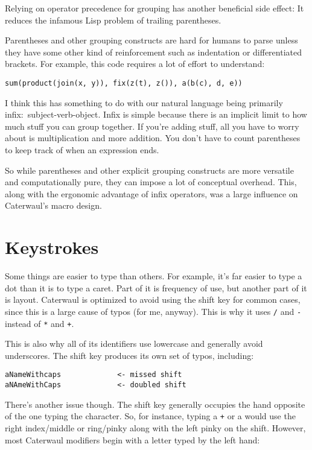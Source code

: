\documentclass{report}
\begin{document}
    Relying on operator precedence for grouping has another beneficial side effect: It reduces the infamous Lisp problem of trailing parentheses.

    Parentheses and other grouping constructs are hard for humans to parse unless they have some other kind of reinforcement such as indentation or differentiated brackets. For example, this
    code requires a lot of effort to understand:

\begin{verbatim}
sum(product(join(x, y)), fix(z(t), z()), a(b(c), d, e))
\end{verbatim}

    I think this has something to do with our natural language being primarily infix:~subject-verb-object. Infix is simple because there is an implicit limit to how much stuff you can group
    together. If you're adding stuff, all you have to worry about is multiplication and more addition. You don't have to count parentheses to keep track of when an expression ends.

    So while parentheses and other explicit grouping constructs are more versatile and computationally pure, they can impose a lot of conceptual overhead. This, along with the ergonomic
    advantage of infix operators, was a large influence on Caterwaul's macro design.

\section{Keystrokes}
    Some things are easier to type than others. For example, it's far easier to type a dot than it is to type a caret. Part of it is frequency of use, but another part of it is layout.
    Caterwaul is optimized to avoid using the shift key for common cases, since this is a large cause of typos (for me, anyway). This is why it uses \verb|/| and \verb|-| instead of \verb|*|
    and \verb|+|.

    This is also why all of its identifiers use lowercase and generally avoid underscores. The shift key produces its own set of typos, including:

\begin{verbatim}
aNameWithcaps             <- missed shift
aNAmeWithCaps             <- doubled shift
\end{verbatim}

    There's another issue though. The shift key generally occupies the hand opposite of the one typing the character. So, for instance, typing a {\tt +} or a {\tt *} would use the right
    index/middle or ring/pinky along with the left pinky on the shift. However, most Caterwaul modifiers begin with a letter typed by the left hand:
\end{document}
